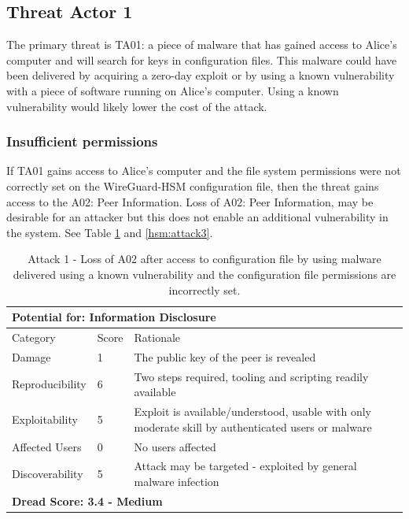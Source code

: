 \documentclass [11pt, proquest] {uwthesis}[2020/02/24]
\begin{document}
\subsection{Threat Actor 1}
The primary threat is TA01: a piece of malware that has gained access to Alice's computer and will search for keys in configuration files. This malware could have been delivered by acquiring a zero-day exploit or by using a known vulnerability with a piece of software running on Alice's computer. Using a known vulnerability would likely lower the cost of the attack.

\subsubsection{Insufficient permissions}
If TA01 gains access to Alice's computer and the file system permissions were not correctly set on the WireGuard-HSM configuration file, then the threat gains access to the A02: Peer Information. Loss of A02: Peer Information, may be desirable for an attacker but this does not enable an additional vulnerability in the system.
See Table \ref{hsm:attack1} and \ref{hsm:attack3}.

\begin{table}[H]
\begin{tabular}{|m{3cm}|m{1cm}|p{27em} |}
\multicolumn{3}{l}{Potential for: Information Disclosure}    \\
\hline
Category & Score & Rationale     \\
\hline
Damage          & 1     & The public key of the peer is revealed  \\
\hline
Reproducibility & 6     & Two steps required, tooling and scripting readily available  \\
\hline
Exploitability & 5      & Exploit is available/understood, usable with only moderate skill by authenticated users or malware \\
\hline
Affected Users  & 0     & No users affected  \\
\hline
Discoverability & 5     & Attack may be targeted - exploited by general malware infection \\
\hline
\multicolumn{3}{l}{\textbf{Dread Score: 3.4 - Medium}} 
\end{tabular}
\caption{Attack 1 - Loss of A02 after access to configuration file by using malware delivered using a known vulnerability and the configuration file permissions are incorrectly set.}
\label{hsm:attack1}
\end{table}
\end{document}
